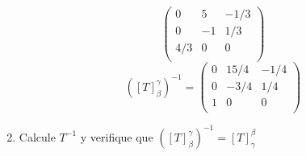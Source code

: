 \begin{enumerate}
\begin{equation*}
       \begin{pmatrix}
            0	& 5	&-1/3\\
  0 &	-1	& 1/3\\
4/3	& 0	 &  0\\ 
       \end{pmatrix}
   \end{equation*}
   \begin{equation*}
   ([T]^{\gamma}_{\beta})^{-1}=
       \begin{pmatrix}
0	& 15/4	& -1/4\\
0	& -3/4	&  1/4\\
1	&    0	&    0\\

       \end{pmatrix}
   \end{equation*}




    \item Calcule $T^{-1}$  y verifique que $\left( \left[ T \right]_{\beta}^{\gamma} \right)^{-1}  = \left[ T \right]_{\gamma}^{\beta}$ 
    

\end{enumerate}
